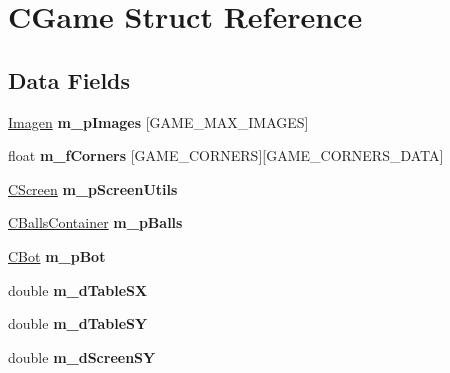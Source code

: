 \hypertarget{struct_c_game}{}\section{C\+Game Struct Reference}
\label{struct_c_game}
\subsection*{Data Fields}
\begin{DoxyCompactItemize}
\item 
\mbox{\label{struct_c_game_a22eb2c7733f89b80c1ed806f4045e997}} 
\hyperlink{struct_imagen}{Imagen} {\bfseries m\+\_\+p\+Images} \mbox{[}G\+A\+M\+E\+\_\+\+M\+A\+X\+\_\+\+I\+M\+A\+G\+ES\mbox{]}
\item 
\mbox{\label{struct_c_game_af78f25ef5d6f124068e2d128c023937d}} 
float {\bfseries m\+\_\+f\+Corners} \mbox{[}G\+A\+M\+E\+\_\+\+C\+O\+R\+N\+E\+RS\mbox{]}\mbox{[}G\+A\+M\+E\+\_\+\+C\+O\+R\+N\+E\+R\+S\+\_\+\+D\+A\+TA\mbox{]}
\item 
\mbox{\label{struct_c_game_aca2af3369b6c5b0a1ede92afc2d43efb}} 
\hyperlink{_screen_utils_8h_a5962029b4ccb4921a7e2f462f60a4a37}{C\+Screen} {\bfseries m\+\_\+p\+Screen\+Utils}
\item 
\mbox{\label{struct_c_game_a4cd808141f37480edd977963e60ee1b7}} 
\hyperlink{struct_c_balls_container}{C\+Balls\+Container} {\bfseries m\+\_\+p\+Balls}
\item 
\mbox{\label{struct_c_game_a84ec39a3b8f03872e1b9c2cb5c5fda3f}} 
\hyperlink{struct_c_bot}{C\+Bot} {\bfseries m\+\_\+p\+Bot}
\item 
\mbox{\label{struct_c_game_ae734e7a160566e2210310d6f3e128a94}} 
double {\bfseries m\+\_\+d\+Table\+SX}
\item 
\mbox{\label{struct_c_game_a73fc94e1f4f5c4c3c9e87e5b0e85703a}} 
double {\bfseries m\+\_\+d\+Table\+SY}
\item 
\mbox{\label{struct_c_game_a7b352b316818225866220ed4ce5e9d14}} 
double {\bfseries m\+\_\+d\+Screen\+SY}
\item 

\end{DoxyCompactItemize}
